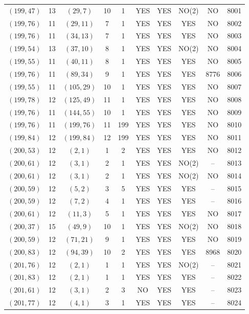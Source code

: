 \begin{longtable}{|c|c|c|c|c|c|c|c|c|c|}
$(199, 47)$ & 13 & $(29, 7)$ & 10 & 1 & YES & YES & NO(2) & NO & 8001\\
$(199, 76)$ & 11 & $(29, 11)$ & 7 & 1 & YES & YES & YES & NO & 8002\\
$(199, 76)$ & 11 & $(34, 13)$ & 7 & 1 & YES & YES & YES & NO & 8003\\
$(199, 54)$ & 13 & $(37, 10)$ & 8 & 1 & YES & YES & NO(2) & NO & 8004\\
$(199, 55)$ & 11 & $(40, 11)$ & 8 & 1 & YES & YES & YES & NO & 8005\\
$(199, 76)$ & 11 & $(89, 34)$ & 9 & 1 & YES & YES & YES & 8776 & 8006\\
$(199, 55)$ & 11 & $(105, 29)$ & 10 & 1 & YES & YES & YES & NO & 8007\\
$(199, 78)$ & 12 & $(125, 49)$ & 11 & 1 & YES & YES & YES & NO & 8008\\
$(199, 76)$ & 11 & $(144, 55)$ & 10 & 1 & YES & YES & YES & NO & 8009\\
$(199, 76)$ & 11 & $(199, 76)$ & 11 & 199 & YES & YES & YES & NO & 8010\\
$(199, 84)$ & 12 & $(199, 84)$ & 12 & 199 & YES & YES & YES & NO & 8011\\
$(200, 53)$ & 12 & $(2, 1)$ & 1 & 2 & YES & YES & YES & NO & 8012\\
$(200, 61)$ & 12 & $(3, 1)$ & 2 & 1 & YES & YES & NO(2) & -- & 8013\\
$(200, 61)$ & 12 & $(3, 1)$ & 2 & 1 & YES & YES & NO(2) & NO & 8014\\
$(200, 59)$ & 12 & $(5, 2)$ & 3 & 5 & YES & YES & YES & -- & 8015\\
$(200, 59)$ & 12 & $(7, 2)$ & 4 & 1 & YES & YES & YES & -- & 8016\\
$(200, 61)$ & 12 & $(11, 3)$ & 5 & 1 & YES & YES & YES & NO & 8017\\
$(200, 37)$ & 15 & $(49, 9)$ & 10 & 1 & YES & YES & NO(2) & NO & 8018\\
$(200, 59)$ & 12 & $(71, 21)$ & 9 & 1 & YES & YES & YES & NO & 8019\\
$(200, 83)$ & 12 & $(94, 39)$ & 10 & 2 & YES & YES & YES & 8968 & 8020\\
$(201, 76)$ & 12 & $(2, 1)$ & 1 & 1 & YES & YES & NO(2) & -- & 8021\\
$(201, 83)$ & 12 & $(2, 1)$ & 1 & 1 & YES & YES & YES & -- & 8022\\
$(201, 61)$ & 12 & $(3, 1)$ & 2 & 3 & NO & YES & YES & -- & 8023\\
$(201, 77)$ & 12 & $(4, 1)$ & 3 & 1 & YES & YES & YES & -- & 8024\\

\end{longtable}
